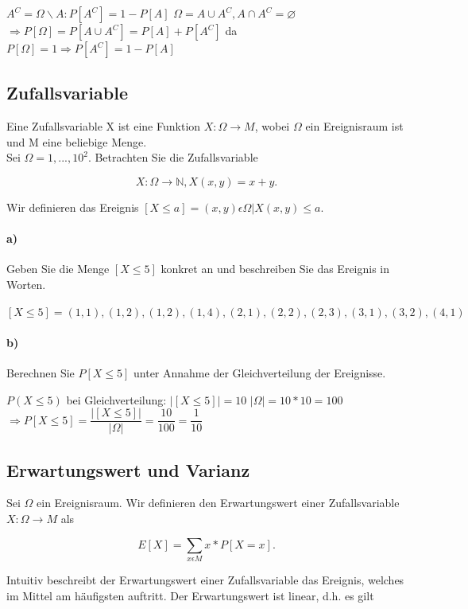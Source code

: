 \documentclass[paper=a4, fontsize=11pt]{scrartcl}
\numberwithin{equation}{section}
\numberwithin{figure}{section}
\numberwithin{table}{section}
\begin{document}
$A^{C} = \Omega \backslash A : P[A^{C}] = 1 - P[A]$
$ \Omega = A \cup A^{C}, A \cap A^{C} = \varnothing$
$\Rightarrow P[ \Omega] = P[A \cup A^{C}] = P[A] + P[A^{C}]$
da $P[ \Omega] = 1 \Rightarrow P[A^{C}] = 1- P[A]$

\subsection{Zufallsvariable}
Eine Zufallsvariable X ist eine Funktion $X: \Omega \rightarrow M$, wobei $\Omega$ ein Ereignisraum ist und M eine beliebige Menge. \\

Sei $\Omega = {1, ..., 10}^{2}$. Betrachten Sie die Zufallsvariable

$$X: \Omega \rightarrow \mathbb{N}, X(x,y) = x+y.$$

Wir definieren das Ereignis $[X \leq a] = {(x,y) \epsilon \Omega | X(x,y) \leq a}.$

\paragraph{a)}
Geben Sie die Menge $[X \leq 5]$ konkret an und beschreiben Sie das Ereignis in Worten.

$[X \leq 5] = {(1,1),(1,2),(1,2),(1,4),(2,1),(2,2),(2,3),(3,1),(3,2),(4,1)}$

\paragraph{b)}
Berechnen Sie $P[X \leq 5]$ unter Annahme der Gleichverteilung der Ereignisse.

$P(X \leq 5)$ bei Gleichverteilung: $|[X \leq 5]| = 10$
$| \Omega| = 10*10 = 100$
$\Rightarrow P[X \leq 5] = \dfrac{|[X \leq 5]|}{| \Omega|} = \dfrac{10}{100} = \dfrac{1}{10}$

\subsection{Erwartungswert und Varianz}
Sei $\Omega$ ein Ereignisraum. Wir definieren den Erwartungswert einer Zufallsvariable $X: \Omega \rightarrow M$ als

$$E[X] = \sum_{x \epsilon M} x * P[X=x].$$

Intuitiv beschreibt der Erwartungswert einer Zufallsvariable das Ereignis, welches im Mittel am häufigsten auftritt. Der Erwartungswert ist linear, d.h. es gilt
\end{document}
